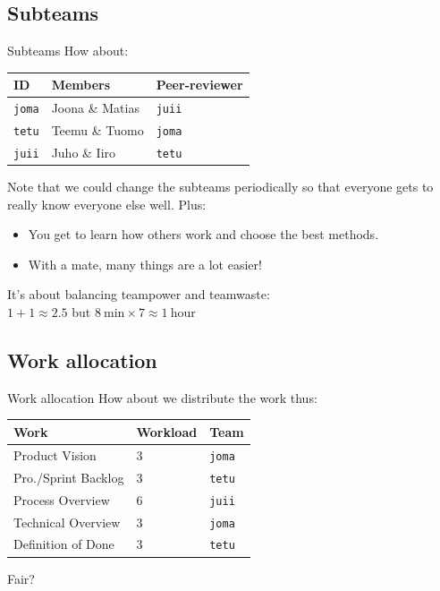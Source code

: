 \documentclass{beamer}
\begin{document}
\subsection{Subteams}
\begin{frame}{Subteams}{}
  How about:
  \begin{table}
  \begin{tabular}{lll}
  ID & Members & Peer-reviewer \\ \hline
  \texttt{joma} & Joona \& Matias & \texttt{juii} \\
  \texttt{tetu} & Teemu \& Tuomo & \texttt{joma} \\
  \texttt{juii} & Juho \& Iiro & \texttt{tetu} \\
  \end{tabular}
  \end{table}
  \pause Note that we could change the subteams periodically so that everyone
  gets to really know everyone else well. Plus:
  \begin{itemize}
  \pause \item You get to learn how others work and choose the best methods.
  \pause \item With a mate, many things are a lot easier!
  \end{itemize}
  \pause It's about balancing team\alert{power} and team\alert{waste}: \\
  $1 + 1 \approx 2.5$ but $8 ~\textrm{min} \times 7 \approx 1 ~\textrm{hour}$
\end{frame}
\subsection{Work allocation}
\begin{frame}{Work allocation}{}
  How about we distribute the work thus:
  \begin{table}
  \begin{tabular}{lll}
  Work & Workload & Team \\ \hline
  \pause Product Vision & 3 & \texttt{joma} \\
  \pause Pro./Sprint Backlog & 3 & \texttt{tetu} \\
  \pause Process Overview & 6 & \texttt{juii} \\
  \pause Technical Overview & 3 & \texttt{joma} \\
  \pause Definition of Done & 3 & \texttt{tetu} \\
  \end{tabular}
  \end{table}
  \pause Fair?
\end{frame}
\end{document}
